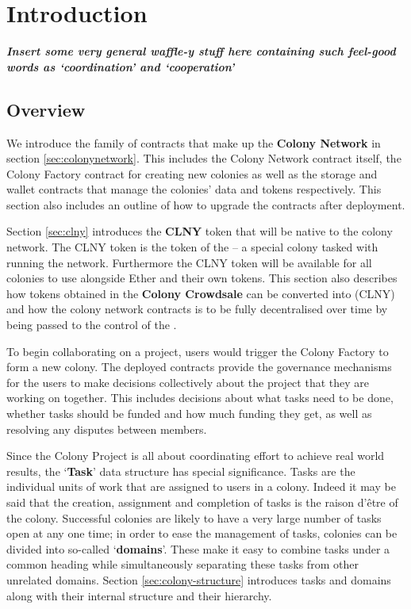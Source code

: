 \section{Introduction}


\textbf{\emph{Insert some very general waffle-y stuff here containing such feel-good words as `coordination' and `cooperation'}}

\subsection{Overview}


We introduce the family of contracts that make up the \textbf{Colony Network} in section \ref{sec:colonynetwork}. This includes the Colony Network contract itself, the Colony Factory contract for creating new colonies as well as the storage and wallet contracts that manage the colonies' data and tokens respectively. This section also includes an outline of how to upgrade the contracts after deployment.

Section \ref{sec:clny} introduces the \textbf{CLNY} token that will be native to the colony network. The CLNY token is the token of the \textbf{\rc} -- a special colony tasked with running the network. Furthermore the CLNY token will be available for all colonies to use alongside Ether and their own tokens. This section also describes how tokens obtained in the \textbf{Colony Crowdsale} can be converted into \rcts (CLNY) and how the colony network contracts is to be fully decentralised over time by being passed to the control of the \rc.

To begin collaborating on a project, users would trigger the Colony Factory to form a new colony. The deployed contracts provide the governance mechanisms for the users to make decisions collectively about the project that they are working on together. This includes decisions about what tasks need to be done, whether tasks should be funded and how much funding they get, as well as resolving any disputes between members.

Since the Colony Project is all about coordinating effort to achieve real world results, the `\textbf{Task}' data structure has special significance. Tasks are the individual units of work that are assigned to  users in a colony. Indeed it may be said that the creation, assignment and completion of tasks is the raison d'être of the colony. Successful colonies are likely to have a very large number of tasks open at any one time; in order to ease the management of tasks, colonies can be divided into so-called `\textbf{domains}'. These make it easy to combine tasks under a common heading while simultaneously separating these tasks from other unrelated domains. Section \ref{sec:colony-structure} introduces tasks and domains along with their internal structure and their hierarchy.

